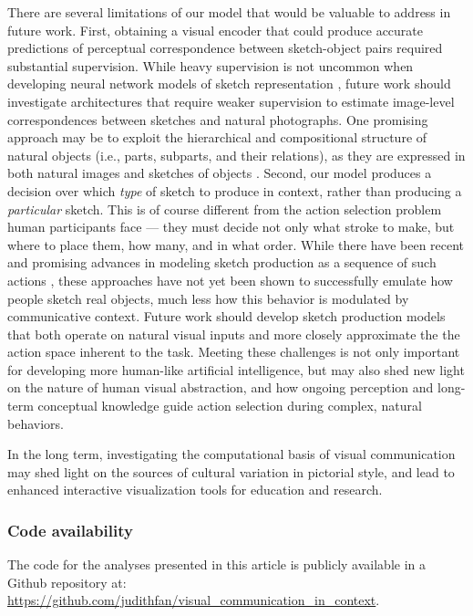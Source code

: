 \documentclass[9pt,twocolumn,twoside]{pnas-new}
\begin{document}

There are several limitations of our model that would be valuable to address in future work. 
First, obtaining a visual encoder that could produce accurate predictions of perceptual correspondence between sketch-object pairs required substantial supervision. 
While heavy supervision is not uncommon when developing neural network models of sketch representation \cite{sangkloy2016sketchy,yu2017sketch,song2017deep}, future work should investigate architectures that require weaker supervision to estimate image-level correspondences between sketches and natural photographs. 
One promising approach may be to exploit the hierarchical and compositional structure of natural objects (i.e., parts, subparts, and their relations), as they are expressed in both natural images and sketches of objects \cite{battaglia2016interaction,mrowca2018graph}.
Second, our model produces a decision over which \textit{type} of sketch to produce in context, rather than producing a \textit{particular} sketch.  
This is of course different from the action selection problem human participants face --- they must decide not only what stroke to make, but where to place them, how many, and in what order.
While there have been recent and promising advances in modeling sketch production as a sequence of such actions \cite{lake2015human,ha2017neural,ganin2018synthesizing}, these approaches have not yet been shown to successfully emulate how people sketch real objects, much less how this behavior is modulated by communicative context. 
Future work should develop sketch production models that both operate on natural visual inputs and more closely approximate the the action space inherent to the task.
Meeting these challenges is not only important for developing more human-like artificial intelligence, but may also shed new light on the nature of human visual abstraction, and how ongoing perception and long-term conceptual knowledge guide action selection during complex, natural behaviors. 

In the long term, investigating the computational basis of visual communication may shed light on the sources of cultural variation in pictorial style, and lead to enhanced interactive visualization tools for education and research.

\subsubsection*{Code availability} The code for the analyses presented in this article is publicly available in a Github repository at: \url{https://github.com/judithfan/visual_communication_in_context}.
\end{document}
